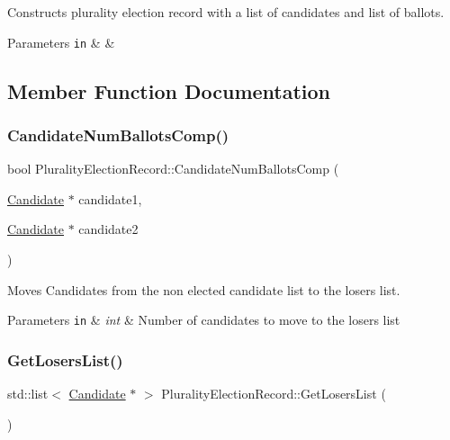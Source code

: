 Constructs plurality election record with a list of candidates and list of ballots. 


\begin{DoxyParams}[1]{Parameters}
\mbox{\tt in}  & {\em } & \\
\hline
\end{DoxyParams}


\subsection{Member Function Documentation}
\mbox{\label{classPluralityElectionRecord_af7b9fef847ef615ff844912a1a851a62}} 
\subsubsection{\texorpdfstring{Candidate\+Num\+Ballots\+Comp()}{CandidateNumBallotsComp()}}
{\footnotesize\ttfamily bool Plurality\+Election\+Record\+::\+Candidate\+Num\+Ballots\+Comp (\begin{DoxyParamCaption}\item[{\hyperlink{classCandidate}{Candidate} $\ast$}]{candidate1,  }\item[{\hyperlink{classCandidate}{Candidate} $\ast$}]{candidate2 }\end{DoxyParamCaption})\hspace{0.3cm}{\ttfamily [static]}}



Moves Candidates from the non elected candidate list to the losers list. 


\begin{DoxyParams}[1]{Parameters}
\mbox{\tt in}  & {\em int} & Number of candidates to move to the losers list \\
\hline
\end{DoxyParams}
\mbox{\label{classPluralityElectionRecord_af998fcfa909f9e781ab5c48bd6b54d77}} 
\subsubsection{\texorpdfstring{Get\+Losers\+List()}{GetLosersList()}}
{\footnotesize\ttfamily std\+::list$<$ \hyperlink{classCandidate}{Candidate} $\ast$ $>$ Plurality\+Election\+Record\+::\+Get\+Losers\+List (\begin{DoxyParamCaption}{ }\end{DoxyParamCaption})}



